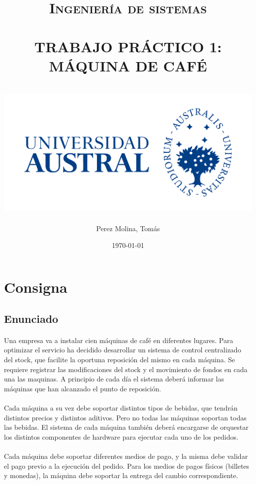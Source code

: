 \documentclass[a4paper,10pt]{extarticle}
\title{	\large \textsc{Ingeniería de sistemas} 	%
		 	\\[2.0cm]								%
            \HRule{0.5pt} \\	
            [0.5cm]
			\LARGE \textbf{\uppercase{Trabajo Práctico 1:\\Máquina de café}}\\	%
            \HRule{0.5pt} \\ 
            [0.5cm]
      \vfill
      \includegraphics[scale=0.75]{austral_logo.jpg}
}
\author{
        Perez Molina, Tomás\\[0.5cm]
}
\date{
    \today\\
}
\makeatletter
\def\printtitle{%
    {\centering \@title\par}}
\def\printauthor{%
    {\centering \large \@author}}
\def\printdate{%
    {\centering \small \@date}}
\makeatother
\begin{document}
\thispagestyle{empty}		%

\printtitle					%
\vfill



\printauthor				%
\printdate
\newpage



\tableofcontents
\thispagestyle{empty}
\pagebreak

\setcounter{page}{1} %

\pagebreak
\section{Consigna}
    \subsection{Enunciado}
        \paragraph{}
        Una empresa va a instalar cien máquinas de café en diferentes lugares. Para optimizar el servicio ha decidido desarrollar un sistema de control centralizado del stock, que facilite la oportuna reposición del mismo en cada máquina. Se requiere registrar las modificaciones del stock y el movimiento de fondos en cada una las maquinas. A principio de cada día el sistema deberá informar las máquinas que han alcanzado el punto de reposición.

        \paragraph{}
        Cada máquina a su vez debe soportar distintos tipos de bebidas, que tendrán distintos precios y distintos aditivos. Pero no todas las máquinas soportan todas las bebidas. El sistema de cada máquina también deberá encargarse de orquestar los distintos componentes de hardware para ejecutar cada uno de los pedidos.

        \paragraph{}
        Cada máquina debe soportar diferentes medios de pago, y la misma debe validar el pago previo a la ejecución del pedido. Para los medios de pagos físicos (billetes y monedas), la máquina debe soportar la entrega del cambio correspondiente.
\end{document}
